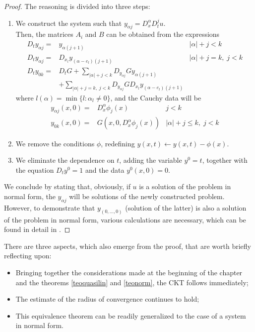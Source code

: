 \begin{proof}
The reasoning is divided into three steps:
\begin{enumerate}
\item We construct the system such that $y_{\alpha j}= D^\alpha_x D^j_t u$. \\ 
Then, the matrices $A_i$ and $B$ can be obtained from the expressions
\begin{align*}
D_t y_{\alpha j} =& y_{\alpha (j+1)} & |\alpha| + j < k \\ 
D_t y_{\alpha j} =& D_{x_l} y_{(\alpha-e_l)(j+1)} & |\alpha| + j = k, \; j < k \\ 
D_t y_{0k} =& D_tG + \sum_{|\alpha|+j < k} D_{y_{\alpha j}}G y_{\alpha (j+1)} \\ 
& + \sum_{|\alpha|+j = k, \; j < k} D_{y_{\alpha j}} G D_{x_l} y_{(\alpha-e_l)(j+1)}
\end{align*}
where $l(\alpha)=\min\{ l:\alpha_l\neq 0 \}$, and the Cauchy data will be
\begin{align*}
y_{\alpha j}(x, 0) = & D_x^{\alpha} \phi_j(x) & j < k \\ 
y_{0k}(x, 0) = & G\left( x, 0, D_x^{\alpha} \phi_j(x) \right) & \lvert \alpha \rvert + j \leq k, \; j < k 
\end{align*}
\item We remove the conditions $\phi$, redefining $y(x,t)\leftarrow y(x,t)-\phi (x)$.
\item We eliminate the dependence on $t$, adding the variable $y^0=t$, together with the equation $D_t y^0=1$ and the data $y^0(x,0)=0$.
\end{enumerate}
We conclude by stating that, obviously, if $u$ is a solution of the problem in normal form, the $y_{\alpha j}$ will be solutions of the newly constructed problem. However, to demonstrate that $y_{(0,\ldots,0)}$ (solution of the latter) is also a solution of the problem in normal form, various calculations are necessary, which can be found in detail in \cite[cap.1]{Folland}.
\end{proof}

\begin{remark}
There are three aspects, which also emerge from the proof, that are worth briefly reflecting upon:
\begin{itemize}
\item Bringing together the considerations made at the beginning of the chapter and the theorems \ref{teoquasilin} and \ref{teonorm}, the CKT follows immediately;
\item The estimate of the radius of convergence continues to hold;
\item This equivalence theorem can be readily generalized to the case of a system in normal form.
\end{itemize}
\end{remark}
